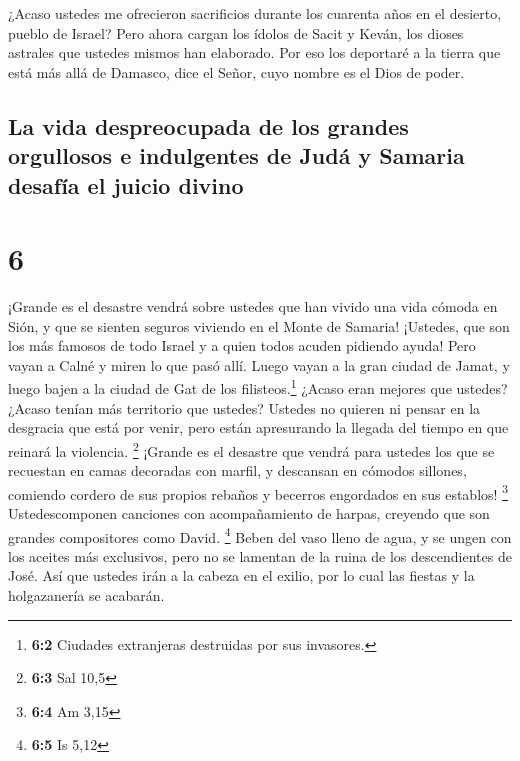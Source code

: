  ¿Acaso ustedes me ofrecieron sacrificios durante los
cuarenta años en el desierto, pueblo de Israel?  Pero
ahora cargan los ídolos de Sacit y Keván, los dioses astrales que
ustedes mismos han elaborado.  Por eso los deportaré a la
tierra que está más allá de Damasco, dice el Señor, cuyo nombre es el
Dios de poder.

\hypertarget{la-vida-despreocupada-de-los-grandes-orgullosos-e-indulgentes-de-juduxe1-y-samaria-desafuxeda-el-juicio-divino}{%
\subsection{La vida despreocupada de los grandes orgullosos e
indulgentes de Judá y Samaria desafía el juicio
divino}\label{la-vida-despreocupada-de-los-grandes-orgullosos-e-indulgentes-de-juduxe1-y-samaria-desafuxeda-el-juicio-divino}}

\hypertarget{section-5}{%
\section{6}\label{section-5}}

 ¡Grande es el desastre vendrá sobre ustedes que han
vivido una vida cómoda en Sión, y que se sienten seguros viviendo en el
Monte de Samaria! ¡Ustedes, que son los más famosos de todo Israel y a
quien todos acuden pidiendo ayuda!  Pero vayan a Calné y
miren lo que pasó allí. Luego vayan a la gran ciudad de Jamat, y luego
bajen a la ciudad de Gat de los filisteos.\footnote{\textbf{6:2}
  Ciudades extranjeras destruidas por sus invasores.} ¿Acaso eran
mejores que ustedes? ¿Acaso tenían más territorio que ustedes?
 Ustedes no quieren ni pensar en la desgracia que está por
venir, pero están apresurando la llegada del tiempo en que reinará la
violencia. \footnote{\textbf{6:3} Sal 10,5}  ¡Grande es el
desastre que vendrá para ustedes los que se recuestan en camas decoradas
con marfil, y descansan en cómodos sillones, comiendo cordero de sus
propios rebaños y becerros engordados en sus establos! \footnote{\textbf{6:4}
  Am 3,15}  Ustedescomponen canciones con acompañamiento
de harpas, creyendo que son grandes compositores como David. \footnote{\textbf{6:5}
  Is 5,12}  Beben del vaso lleno de agua, y se ungen con
los aceites más exclusivos, pero no se lamentan de la ruina de los
descendientes de José.  Así que ustedes irán a la cabeza
en el exilio, por lo cual las fiestas y la holgazanería se acabarán.

